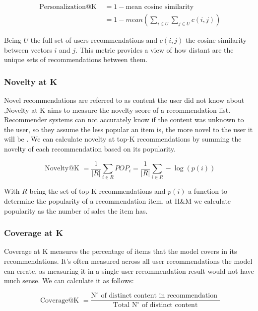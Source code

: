 \documentclass{kththesis}
\begin{document}
\begin{equation}
\begin{aligned}
\text { Personalization@K } &= 1 - \text{mean cosine similarity} \\
&= 1 - mean(\sum_{i \in U}\sum_{j \in U}c(i,j))
\end{aligned}
\end{equation}

Being $U$ the full set of users recommendations and $c(i,j)$ the cosine similarity between vectors $i$ and $j$. This metric provides a view of how distant are the unique sets of recommendations between them.


\subsubsection{Novelty at K}
Novel recommendations are referred to as content the user did not know about \cite{noveltyintro},Novelty at K aims to measure the novelty score of a recommendation list. Recommender systems can not accurately know if the content was unknown to the user, so they assume the less popular an item is, the more novel to the user it will be \cite{noveltyassumption}. We can calculate novelty at top-K recommendations by summing the novelty of each recommendation based on its popularity. 


\begin{equation}
\text { Novelty@K }=\frac{1}{|R|} \sum_{i \in R} P O P_{i}=\frac{1}{|R|} \sum_{i \in R}-\log (p(i))
\end{equation}

With $R$ being the set of top-K recommendations and $p(i)$ a function to determine the popularity of a recommendation item. at H\&M we calculate popularity as the number of sales the item has.

\subsubsection{Coverage at K}
Coverage at K measures the percentage of items that the model covers in its recommendations. It's often measured across all user recommendations the model can create, as measuring it in a single user recommendation result would not have much sense. We can calculate it as follows:

\begin{equation}
\text { Coverage@K }=\frac{\mathrm{N}^{\circ} \text { of distinct content in recommendation }}{\text { Total } \mathrm{N}^{\circ} \text { of distinct content }}
\end{equation}
\end{document}
